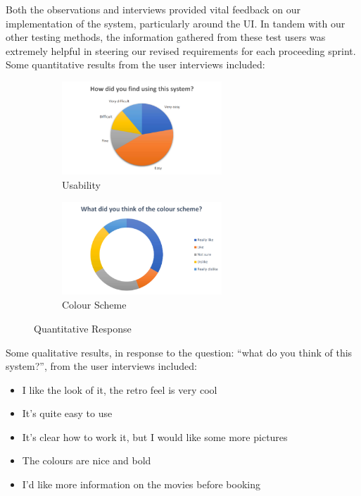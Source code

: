\documentclass[11pt, english]{article}
\begin{document}
	Both the observations and interviews provided vital feedback on our implementation of the system, particularly around the UI. In tandem with our other testing methods, the information gathered from these test users was extremely helpful in steering our revised requirements for each proceeding sprint.\\

	Some quantitative results from the user interviews included:

	\begin{figure}[H]
        \begin{center}
                \begin{subfigure}[t]{6cm}
                \begin{center}
                        \includegraphics[width=6cm,height=3.5cm]{CS993_IMG/Testing5.png}
                \end{center}
                        \caption{Usability}
                \end{subfigure}
                \begin{subfigure}[t]{6cm}
                \begin{center}
                        \includegraphics[width=6cm,height=3.5cm]{CS993_IMG/Testing6.png}
                \end{center}
                        \caption{Colour Scheme}
                \end{subfigure}
        \end{center}
		\caption{Quantitative Response}
        \end{figure}

	Some qualitative results, in response to the question: ``what do you think of this system?'', from the user interviews included:

	\begin{itemize}
        \setlength\itemsep{0cm}
		\item I like the look of it, the retro feel is very cool
		\item It's quite easy to use
		\item It's clear how to work it, but I would like some more pictures
		\item The colours are nice and bold
		\item I'd like more information on the movies before booking
	\end{itemize}
\end{document}

